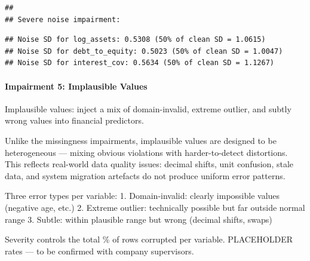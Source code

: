 \documentclass[
]{article}
\newenvironment{Shaded}{\begin{snugshade}}{\end{snugshade}}
\newcommand{\AttributeTok}[1]{\textcolor[rgb]{0.13,0.29,0.53}{#1}}
\newcommand{\FunctionTok}[1]{\textcolor[rgb]{0.13,0.29,0.53}{\textbf{#1}}}
\newcommand{\NormalTok}[1]{#1}
\newcommand{\OtherTok}[1]{\textcolor[rgb]{0.56,0.35,0.01}{#1}}
\newcommand{\SpecialCharTok}[1]{\textcolor[rgb]{0.81,0.36,0.00}{\textbf{#1}}}
\newcommand{\StringTok}[1]{\textcolor[rgb]{0.31,0.60,0.02}{#1}}
\begin{document}
\begin{verbatim}
## 
## Severe noise impairment:
\end{verbatim}

\begin{Shaded}
\end{Shaded}

\begin{verbatim}
## Noise SD for log_assets: 0.5308 (50% of clean SD = 1.0615)
## Noise SD for debt_to_equity: 0.5023 (50% of clean SD = 1.0047)
## Noise SD for interest_cov: 0.5634 (50% of clean SD = 1.1267)
\end{verbatim}

\paragraph{\texorpdfstring{\textbf{Impairment 5: Implausible
Values}}{Impairment 5: Implausible Values}}\label{impairment-5-implausible-values}

Implausible values: inject a mix of domain-invalid, extreme outlier, and
subtly wrong values into financial predictors.

Unlike the missingness impairments, implausible values are designed to
be heterogeneous --- mixing obvious violations with harder-to-detect
distortions. This reflects real-world data quality issues: decimal
shifts, unit confusion, stale data, and system migration artefacts do
not produce uniform error patterns.

Three error types per variable: 1. Domain-invalid: clearly impossible
values (negative age, etc.) 2. Extreme outlier: technically possible but
far outside normal range 3. Subtle: within plausible range but wrong
(decimal shifts, swaps)

Severity controls the total \% of rows corrupted per variable.
PLACEHOLDER rates --- to be confirmed with company supervisors.
\end{document}
